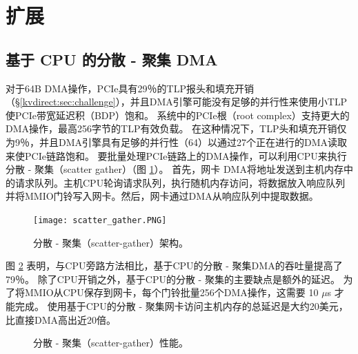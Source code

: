 \section{扩展}
\label{kvdirect:sec:extensions}

\subsection{基于 CPU 的分散 - 聚集 DMA}


对于64B DMA操作，PCIe具有29％的TLP报头和填充开销（\S \ref {kvdirect:sec:challenge}），并且DMA引擎可能没有足够的并行性来使用小TLP使PCIe带宽延迟积（BDP）饱和。
系统中的PCIe根（root complex）支持更大的DMA操作，最高256字节的TLP有效负载。 在这种情况下，TLP头和填充开销仅为9％，并且DMA引擎具有足够的并行性（64）以通过27个正在进行的DMA读取来使PCIe链路饱和。
要批量处理PCIe链路上的DMA操作，可以利用CPU来执行分散 - 聚集（scatter gather）（图 \ref {kvdirect:fig:sg-arch}）。
首先，网卡 DMA将地址发送到主机内存中的请求队列。主机CPU轮询请求队列，执行随机内存访问，将数据放入响应队列并将MMIO门铃写入网卡。然后，网卡通过DMA从响应队列中提取数据。


\begin{figure}[htbp]
		\centering
		\texttt{[image: scatter\_gather.PNG]}
		\caption{分散 - 聚集（scatter-gather）架构。}
		\label{kvdirect:fig:sg-arch}
\end{figure}


图 \ref {kvdirect:fig:scatter-gather} 表明，与CPU旁路方法相比，基于CPU的分散 - 聚集DMA的吞吐量提高了79％。
除了CPU开销之外，基于CPU的分散 - 聚集的主要缺点是额外的延迟。
为了将MMIO从CPU保存到网卡，每个门铃批量256个DMA操作，这需要 10 $\mu$s 才能完成。
使用基于CPU的分散 - 聚集网卡访问主机内存的总延迟是大约20美元，比直接DMA高出近20倍。




\begin{figure}[htbp]
	\centering
	\caption{分散 - 聚集（scatter-gather）性能。}
	\label{kvdirect:fig:scatter-gather}
\end{figure}


